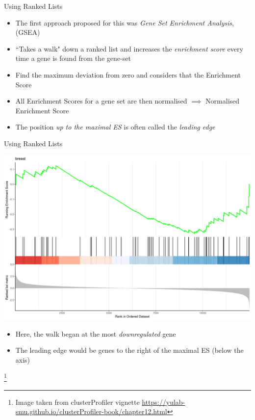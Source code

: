 \documentclass[aspectratio=169,11pt]{beamer}
\newcommand\blfootnote[1]{%
  \begingroup
  \renewcommand\thefootnote{}\footnote{#1}%
  \addtocounter{footnote}{-1}%
  \endgroup
}
\begin{document}
\begin{frame}{Using Ranked Lists}

	\begin{itemize}
		\item The first approach proposed for this was \textit{Gene Set Enrichment Analysis}, (GSEA)
		\item ``Takes a walk" down a ranked list and increases the \textit{enrichment score} every time a gene is found from the gene-set
		\item Find the maximum deviation from zero and considers that the Enrichment Score
		\item All Enrichment Scores for a gene set are then normalised $\implies$ Normalised Enrichment Score
		\item The position \textit{up to the maximal ES} is often called the \textit{leading edge}
	\end{itemize}


\end{frame}

\begin{frame}{Using Ranked Lists}

	\begin{center}
		\includegraphics[width=0.5\linewidth]{figures/gseaplot2-1.png} 
	\end{center}
	
	\begin{itemize}
		\item Here, the walk began at the most \textit{downregulated} gene
		\item The leading edge would be genes to the right of the maximal ES (below the axis)
	\end{itemize}
	
	
	\blfootnote{Image taken from clusterProfiler vignette \url{https://yulab-smu.github.io/clusterProfiler-book/chapter12.html}}


\end{frame}
\end{document}
